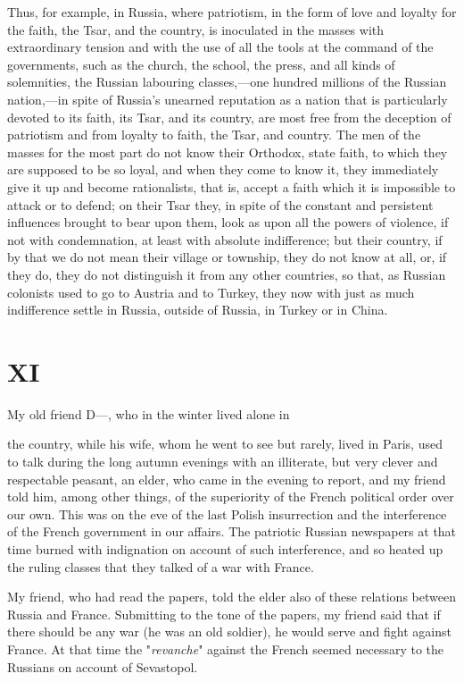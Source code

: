 \documentclass{book}
\begin{document}
Thus, for example, in Russia, where patriotism, in the form of love and loyalty for the faith, the Tsar, and the country, is inoculated in the masses with extraordinary tension and with the use of all the tools at the command of the governments, such as the church, the school, the press, and all kinds of solemnities, the Russian labouring classes,—one hundred millions of the Russian nation,—in spite of Russia’s unearned reputation as a nation that is particularly devoted to its faith, its Tsar, and its country, are most free from the deception of patriotism and from loyalty to faith, the Tsar, and country. The men of the masses for the most part do not know their Orthodox, state faith, to which they are supposed to be so loyal, and when they come to know it, they immediately give it up and become rationalists, that is, accept a faith which it is impossible to attack or to defend; on their Tsar they, in spite of the constant and persistent influences brought to bear upon them, look as upon all the powers of violence, if not with condemnation, at least with absolute indifference; but their country, if by that we do not mean their village or township, they do not know at all, or, if they do, they do not distinguish it from any other countries, so that, as Russian colonists used to go to Austria and to Turkey, they now with just as much indifference settle in Russia, outside of Russia, in Turkey or in China.

\chapter{XI}
\label{chapter-11}
My old friend D—, who in the winter lived alone in

the country, while his wife, whom he went to see but rarely, lived in Paris, used to talk during the long autumn evenings with an illiterate, but very clever and respectable peasant, an elder, who came in the evening to report, and my friend told him, among other things, of the superiority of the French political order over our own. This was on the eve of the last Polish insurrection and the interference of the French government in our affairs. The patriotic Russian newspapers at that time burned with indignation on account of such interference, and so heated up the ruling classes that they talked of a war with France.

My friend, who had read the papers, told the elder also of these relations between Russia and France. Submitting to the tone of the papers, my friend said that if there should be any war (he was an old soldier), he would serve and fight against France. At that time the "\emph{revanche}" against the French seemed necessary to the Russians on account of Sevastopol.
\end{document}
